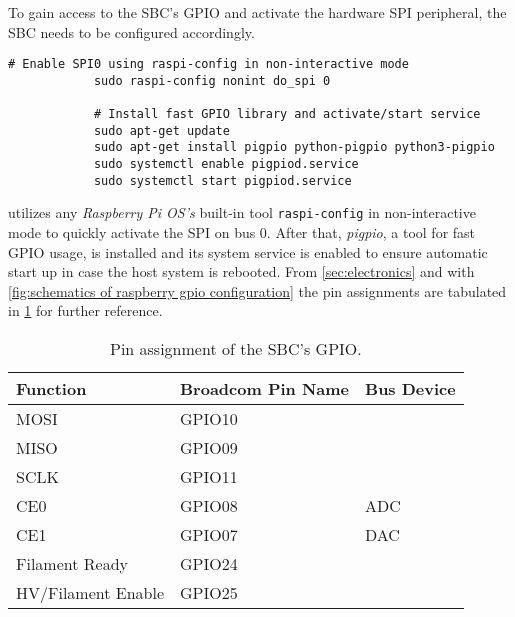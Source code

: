        To gain access to the SBC's GPIO and activate the hardware SPI peripheral, the SBC needs to be configured accordingly.
        \begin{lstlisting}[style=mybash,numbers=none, caption={[Activating SPI0 and installing \texttt{pigpio}]Activating SPI0 and installing \texttt{pigpio}. Enabling the system service ensures automatic start up after boot.},label={lst:SPI0 and pigpio}]
            # Enable SPI0 using raspi-config in non-interactive mode
            sudo raspi-config nonint do_spi 0

            # Install fast GPIO library and activate/start service
            sudo apt-get update
            sudo apt-get install pigpio python-pigpio python3-pigpio
            sudo systemctl enable pigpiod.service
            sudo systemctl start pigpiod.service
        \end{lstlisting}
         utilizes any \textit{Raspberry Pi OS's} built-in tool \texttt{raspi-config} in non-interactive mode to quickly activate the SPI on bus 0.
        After that, \textit{pigpio}, a tool for fast GPIO usage, is installed and its system service is enabled to ensure automatic start up in case the host system is rebooted.
        From \cref{sec:electronics} and with \cref{fig:schematics of raspberry gpio configuration} the pin assignments are tabulated in \cref{tab:gpio assignment} for further reference.

        \begin{table}[h]
            \centering
            \caption[Pin assignment of the SBC's GPIO]{Pin assignment of the SBC's GPIO.}%
            \label{tab:gpio assignment}
            \begin{tabular}{@{}lll@{}}
                \toprule
                Function&           Broadcom Pin Name&  Bus Device\\
                \midrule
                MOSI&	            GPIO10&\\
                MISO&	            GPIO09&\\
                SCLK&	            GPIO11&\\
                CE0&	            GPIO08&             ADC\\
                CE1&	            GPIO07&             DAC\\
                Filament Ready&     GPIO24&\\
                HV/Filament Enable& GPIO25&\\
                \bottomrule
            \end{tabular}
        \end{table}

